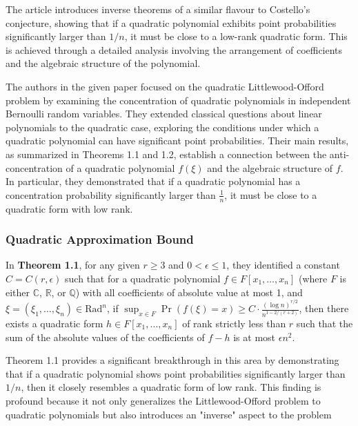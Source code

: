 The article introduces inverse theorems of a similar flavour to Costello's
conjecture, showing that if a quadratic polynomial exhibits point
probabilities significantly larger than ${1/n}$,
it must be close to a low-rank quadratic form.
This is achieved through a detailed analysis
involving the arrangement of coefficients
and the algebraic structure of the polynomial.

The authors in the given paper focused on the quadratic
Littlewood-Offord problem by examining the concentration
of quadratic polynomials in independent Bernoulli random
variables. They extended classical questions about linear
polynomials to the quadratic case, exploring the
conditions under which a quadratic polynomial can have
significant point probabilities. Their main results,
as summarized in Theorems 1.1 and 1.2, establish a connection
between the anti-concentration of a quadratic polynomial 
$f(\xi)$ and the algebraic structure of $f$.
In particular,
they demonstrated that if a quadratic polynomial has a 
concentration probability significantly
larger than $\frac{1}{n}$, it must be close to
a quadratic form with low rank.

\subsubsection{Quadratic Approximation Bound}
In \textbf{Theorem 1.1}, for any given $r \geq 3$ and
$0 < \epsilon \leq 1$, they identified a constant
$C = C(r, \epsilon)$ such that for a quadratic polynomial
$f \in F[x_1, \dots, x_n]$ (where $F$ is either 
$\mathbb{C}$, $\mathbb{R}$, or $\mathbb{Q}$) with all coefficients
of absolute value at most 1, and
$\xi = (\xi_1, \dots, \xi_n) \in \text{Rad}^n$, if
${\sup_{x \in F} \Pr(f(\xi) = x) \geq C \cdot \frac{(\log n)^{r/2}}{n^{1-2/(r+2)}}}$,
then there exists a quadratic form
$h \in F[x_1, \dots, x_n]$ of rank strictly less than $r$
such that the sum of the absolute values of the coefficients
of $f - h$ is at most $\epsilon n^2$.
 
Theorem 1.1 provides a significant breakthrough in this 
area by demonstrating that if a quadratic polynomial shows 
point probabilities significantly larger than $1/n$, then
it closely resembles a quadratic form of low rank.
This finding is profound because it not only generalizes
the Littlewood-Offord problem to quadratic polynomials
but also introduces an "inverse" aspect to the problem

